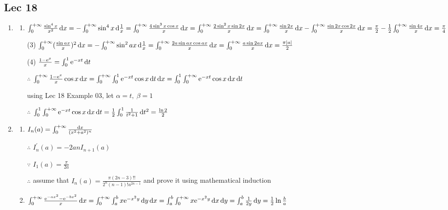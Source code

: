 \subsection{Lec 18}
    \begin{enumerate}[1]
    \item
        \begin{enumerate}[(1)]
        \item
        $\int_0^{+\infty} \frac{ \sin ^4x}{x^2} \dif x =-\int_0^{+\infty}  \sin ^4 x\dif \frac{1}{x}=\int_0^{+\infty} \frac{4 \sin ^3x\cos x}{x}\dif x =\int_0^{+\infty} \frac{2 \sin ^2x \sin 2x}{x}\dif x=\int_0^{+\infty} \frac{ \sin 2x}{x}\dif x-\int_0^{+\infty}\frac{ \sin 2x\cos 2x}{x}\dif x=\frac{\pi}{2}-\frac{1}{2}\int_0^{+\infty}\frac{ \sin 4x}{x}\dif x=\frac{\pi}{4}$

        \item[(3)]
        $\int_0^{+\infty} (\frac{ \sin ax}{x})^2 \dif x=-\int_0^{+\infty}  \sin ^2ax \dif \frac{1}{x}=\int_0^{+\infty}\frac{2a \sin ax\cos ax}{x}\dif x=\int_0^{+\infty}\frac{a \sin 2ax}{x}\dif x=\frac{\pi |a|}{2}$


        \item[(4)]
        $\frac{1-\me^x}{x}=\int_0^1 \me^{-xt} \dif t$
        \par $\therefore$ $\int_0^{+\infty} \frac{1-\me^x}{x}\cos x\dif x=\int_0^{+\infty}\int_0^1 \me^{-xt}\cos x \dif t\dif x=\int_0^1 \int_0^{+\infty} \me^{-xt}\cos x\dif x \dif t$
        \par using Lec 18 Example 03, let $\alpha=t,\ \beta=1$
        \par $\therefore$ $\int_0^1 \int_0^{+\infty} \me^{-xt}\cos x\dif x \dif t=\frac{1}{2}\int_0^1 \frac{1}{t^2+1} \dif t^2=\frac{\ln 2}{2}$
        \end{enumerate}

        \item
        \begin{enumerate}[(1)]
        \item
        $I_n(a)=\int_0^{+\infty} \frac{\dif x}{(x^2+a^2)^n}$
        \par $\therefore$ $I_n^{'}(a)=-2anI_{n+1}(a)$
        \par $\because$ $I_1(a)=\frac{\pi}{2a}$
        \par $\therefore$ assume that $I_n(a)=\frac{\pi (2n-3)!!}{2^n(n-1)!a^{2n-1}}$ and prove it using mathematical induction

        \item
        $\int_0^{+\infty} \frac{\me^{-ax^2}-\me^{-bx^2}}{x}\dif x=\int_0^{+\infty} \int_a^b x\me^{-x^2y} \dif y\dif x=\int_a^b \int_0^{+\infty} x\me^{-x^2y} \dif x\dif y=\int_a^b \frac{1}{2y}\dif y=\frac{1}{2}\ln \frac{b}{a}$


\end{enumerate}
\end{enumerate}
